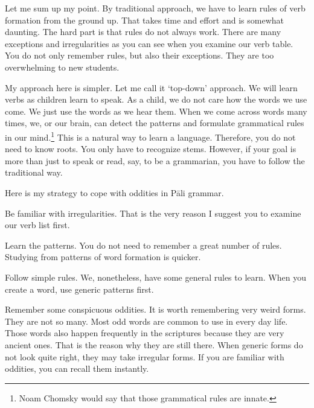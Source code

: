 Let me sum up my point. By traditional approach, we have to learn rules of verb formation from the ground up. That takes time and effort and is somewhat daunting. The hard part is that rules do not always work. There are many exceptions and irregularities as you can see when you examine our verb table. You do not only remember rules, but also their exceptions. They are too overwhelming to new students.

My approach here is simpler. Let me call it `top-down' approach. We will learn verbs as children learn to speak. As a child, we do not care how the words we use come. We just use the words as we hear them. When we come across words many times, we, or our brain, can detect the patterns and formulate grammatical rules in our mind.\footnote{Noam Chomsky would say that those grammatical rules are innate.} This is a natural way to learn a language. Therefore, you do not need to know roots. You only have to recognize stems. However, if your goal is more than just to speak or read, say, to be a grammarian, you have to follow the traditional way.

Here is my strategy to cope with oddities in P\=ali grammar.
\begin{compactenum}[(1)]
\item Be familiar with irregularities. That is the very reason I suggest you to examine our verb list first.
\item Learn the patterns. You do not need to remember a great number of rules. Studying from patterns of word formation is quicker. 
\item Follow simple rules. We, nonetheless, have some general rules to learn. When you create a word, use generic patterns first.
\item Remember some conspicuous oddities. It is worth remembering very weird forms. They are not so many. Most odd words are common to use in every day life. Those words also happen frequently in the scriptures because they are very ancient ones. That is the reason why they are still there. When generic forms do not look quite right, they may take irregular forms. If you are familiar with oddities, you can recall them instantly.
\end{compactenum}

